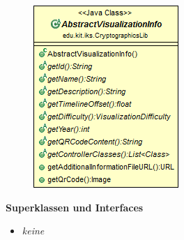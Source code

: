 \documentclass{article}
\begin{document}
      \begin{figure}[H]
        \centering
        \includegraphics{resources/edu-kit-iks-CryptographicsLib-AbstractVisualizationInfo}
      \end{figure}
	
      \textbf{Superklassen und Interfaces}
      \begin{itemize}
        \item \textit{keine}
      \end{itemize}
	
\end{document}

